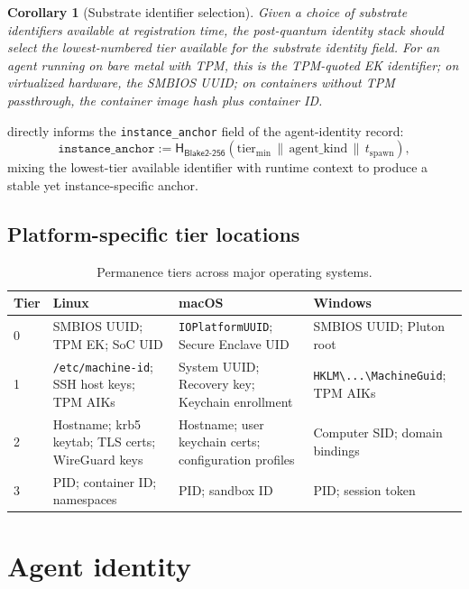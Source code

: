 \documentclass[11pt,a4paper,parskip=half-,DIV=12,headings=standardclasses]{scrartcl}
\theoremstyle{ncthm}
\newtheorem{corollary}[theorem]{Corollary}
\theoremstyle{ncdef}
\newcommand{\Hash}{\mathsf{H}}
\begin{document}
\begin{corollary}[Substrate identifier selection]\label{cor:substrate-selection}
Given a choice of substrate identifiers available at registration
time, the post-quantum identity stack should select the
\emph{lowest-numbered tier available} for the substrate identity
field. For an agent running on bare metal with TPM, this is the
TPM-quoted EK identifier; on virtualized hardware, the SMBIOS UUID;
on containers without TPM passthrough, the container image hash plus
container ID.
\end{corollary}

 directly informs the
\texttt{instance\_anchor} field of the agent-identity record:
\[
\texttt{instance\_anchor} := \Hash_{\textsf{Blake2-256}}(\text{tier}_{\min} \,\|\, \text{agent\_kind} \,\|\, t_{\mathrm{spawn}}),
\]
mixing the lowest-tier available identifier with runtime context to
produce a stable yet instance-specific anchor.

\subsection{Platform-specific tier locations}

\begin{table}[h]
\centering
\small
\begin{tabular}{@{}lp{4cm}p{4cm}p{4cm}@{}}
\toprule
\textsf{Tier} & \textsf{Linux} & \textsf{macOS} & \textsf{Windows}\\
\midrule
0 & SMBIOS UUID; TPM EK; SoC UID & \texttt{IOPlatformUUID}; Secure Enclave UID & SMBIOS UUID; Pluton root\\
1 & \texttt{/etc/machine-id}; SSH host keys; TPM AIKs &
    System UUID; Recovery key; Keychain enrollment &
    \texttt{HKLM\textbackslash...\textbackslash MachineGuid};
    TPM AIKs\\
2 & Hostname; krb5 keytab; TLS certs; WireGuard keys &
    Hostname; user keychain certs; configuration profiles &
    Computer SID; domain bindings\\
3 & PID; container ID; namespaces & PID; sandbox ID & PID; session token\\
\bottomrule
\end{tabular}
\caption{Permanence tiers across major operating systems.}
\label{tab:tier-platforms}
\end{table}

\section{Agent identity}\label{sec:agent}
\end{document}
